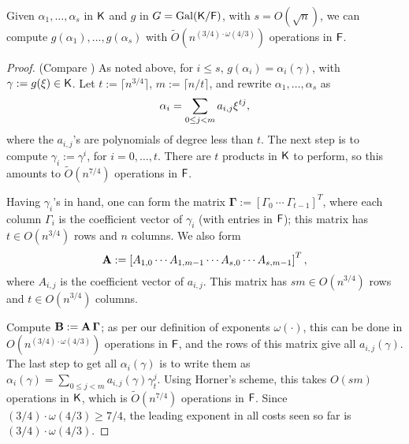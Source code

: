 \begin{lemma}
  \label{lem:modcom}
  Given $\alpha_1,\dots,\alpha_s$ in ${\mathsf{K}}$ and $g$ in $G =
  \mathrm{Gal}({\mathsf{K}}/{\mathsf{F}})$, with $s = O(\sqrt{n})$, we can compute
  $g(\alpha_1),\dots,g(\alpha_s)$ with $\tilde
  O(n^{(3/4)\cdot\omega(4/3)})$ operations in ${\mathsf{F}}$.
\end{lemma}
\begin{proof}
(Compare \citealt[Lemma~3]{KalSho98}) As noted above, for $i\le s$,
  $g(\alpha_i) = \alpha_i(\gamma)$, with $\gamma := g(\xi) \in {\mathsf{K}}$.
  Let $t := \lceil n^{3/4} \rceil$, $m:=\lceil n/t\rceil$, and rewrite $\alpha_1 , \ldots , \alpha_s$ as 
$$\alpha_i = \sum_{0 \leq j < m} a_{i,j}\xi^{tj},$$ where the
  $a_{i,j}$'s are polynomials of degree less than $t$. The next step
  is to compute $\gamma_i := \gamma^i$, for $i = 0 , \ldots , t$.
  There are $t$ products in ${\mathsf{K}}$ to perform, so this amounts to
  $\tilde{O}(n^{7/4})$ operations in ${\mathsf{F}}$.

  Having $\gamma_i$'s in hand, one can form the matrix
  $\boldsymbol{\Gamma} := \left[ \Gamma_0 ~ \cdots ~ \Gamma_{t-1}
    \right]^T$, where each column $\Gamma_i$ is the coefficient vector
  of $\gamma_i$ (with entries in ${\mathsf{F}}$); this matrix has $t \in
  O(n^{3/4})$ rows and $n$ columns. We also form
  $$\mat A := \left[{A}_{1,0} \cdots {A}_{1,m-1} \cdots
    {A}_{s,0} \cdots {A}_{s,m-1}\right]^T,$$ where
  ${A}_{i,j}$ is the coefficient vector of $a_{i,j}$. This matrix 
  has $s m \in O(n^{3/4})$ rows and $t \in O(n^{3/4})$ columns.

  Compute $\mat B:=\mat A\, \boldsymbol{\Gamma}$; as per our
  definition of exponents $\omega(\cdot )$, this can be done in
  $O(n^{(3/4)\cdot \omega(4/3)})$ operations in ${\mathsf{F}}$, and the rows of this matrix
  give all $a_{i,j}(\gamma)$.  The last step to get all
  $\alpha_i(\gamma)$ is to write them as $\alpha_i(\gamma) = \sum_{0
    \leq j < m} a_{i,j}(\gamma) \gamma_t^{j}.$ Using Horner's scheme,
  this takes $O(sm)$ operations in ${\mathsf{K}}$, which is $\tilde{O}(n^{7/4})$
  operations in ${\mathsf{F}}$. Since $(3/4)\cdot\omega(4/3) \ge 7/4$,
  the leading exponent in all costs seen so far is
  $(3/4)\cdot\omega(4/3)$.
\end{proof}


